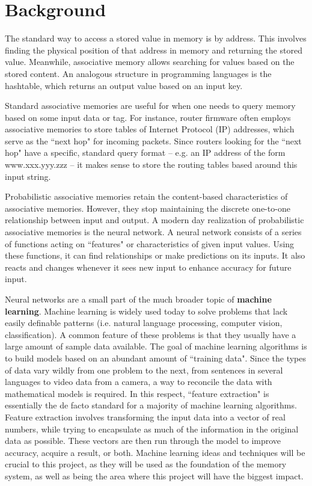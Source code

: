 \documentclass{sig-alternate}
\begin{document}
\section{Background}
\label{sec:intro}

The standard way to access a stored value in memory is by address. 
This involves finding the physical position of that address in memory
and returning the stored value. Meanwhile, associative memory allows
searching for values based on the stored content. An analogous structure
in programming languages is the hashtable, which returns an output value
based on an input key. 

Standard associative memories are useful for when one needs to query memory based 
on some input data or tag. For instance, router firmware often employs associative 
memories to store tables of Internet Protocol (IP) addresses, which serve as the ``next hop" for incoming 
packets. Since routers looking for the ``next hop" have a specific, standard query 
format -- e.g. an IP address of the form www.xxx.yyy.zzz -- it makes sense to store the 
routing tables based around this input string.

Probabilistic associative memories retain the content-based characteristics of associative memories.
However, they stop maintaining the discrete one-to-one relationship between input and output.
A modern day realization of probabilistic associative memories is the neural network. A neural network
consists of a series of functions acting on ``features" or characteristics of given input values. Using
these functions, it can find relationships or make predictions on its inputs. It also
reacts and changes whenever it sees new input to enhance accuracy for future input.

Neural networks are a small part of the much broader topic of \textbf{machine learning}. Machine learning
is widely used today to solve problems that lack easily definable patterns (i.e. natural language processing,
computer vision, classification). A common feature of these problems is that they usually have a large amount
of sample data available. The goal of machine learning algorithms is to build models based on an
abundant amount of ``training data". Since the types of data vary wildly from one problem to the next,
from sentences in several languages to video data from a camera, a way to reconcile the data with
mathematical models is required. In this respect, ``feature extraction" is essentially the de facto
standard for a majority of machine learning algorithms. Feature extraction involves transforming the
input data into a vector of real numbers, while trying to encapsulate as much of the information
in the original data as possible. These vectors are then run through the model to improve accuracy,
acquire a result, or both. Machine learning ideas and techniques will be crucial to this project,
as they will be used as the foundation of the memory system, as well as being the area where this project
will have the biggest impact.
\end{document}
